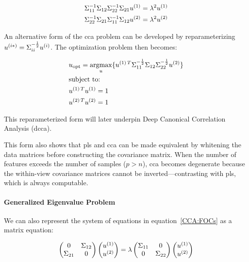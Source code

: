 \begin{align}
    & \Sigma_{11}^{-1}\Sigma_{12}\Sigma_{22}^{-1}\Sigma_{21}u^{(1)}=\lambda^2u^{(1)} \notag \\
    & \Sigma_{22}^{-1}\Sigma_{21}\Sigma_{11}^{-1}\Sigma_{12}u^{(2)}=\lambda^2u^{(2)} \notag
\end{align}

An alternative form of the \acrshort{cca} problem can be developed by reparameterizing \(u^{(i*)}=\Sigma_{ii}^{-\frac{1}{2}}u^{(i)}\). The optimization problem then becomes:

\begin{align}
    & u_{\text{opt}}=\underset{u}{\mathrm{argmax}}\{ u^{(1)\,T}\Sigma_{11}^{-\frac{1}{2}}\Sigma_{12}\Sigma_{22}^{-\frac{1}{2}}u^{(2)} \} \\
    & \text{subject to:} \notag                                                                                                            \\
    & u^{(1)\,T}u^{(1)}=1 \notag                                                                                                         \\
    & u^{(2)\,T}u^{(2)}=1 \notag
\end{align}

This reparameterized form will later underpin Deep Canonical Correlation Analysis (\acrshort{dcca}).

This form also shows that \acrshort{pls} and \acrshort{cca} can be made equivalent by whitening the data matrices before constructing the covariance matrix. When the number of features exceeds the number of samples (\(p>n\)), \acrshort{cca} becomes degenerate because the within-view covariance matrices cannot be inverted—contrasting with \acrshort{pls}, which is always computable.

\paragraph{Generalized Eigenvalue Problem}

We can also represent the system of equations in equation~\ref{CCA:FOCs} as a matrix equation:

\begin{align}
    \begin{pmatrix}
        0           & \Sigma_{12} \\
        \Sigma_{21} & 0
    \end{pmatrix}
    \begin{pmatrix}
        u^{(1)} \\
        u^{(2)}
    \end{pmatrix}
    =
    \lambda
    \begin{pmatrix}
        \Sigma_{11} & 0           \\
        0           & \Sigma_{22}
    \end{pmatrix}
    \begin{pmatrix}
        u^{(1)} \\
        u^{(2)}
    \end{pmatrix}
\end{align}

